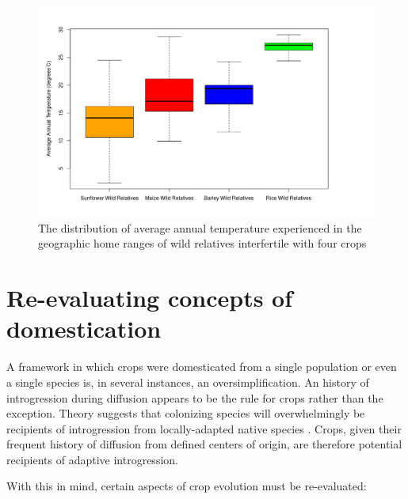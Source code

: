\documentclass[11pt]{article}
\begin{document}
\begin{figure}[h]
	\centering
	\includegraphics[width=17.35cm]{boxplot.png}
	\caption{The distribution of average annual temperature experienced in the geographic home ranges of wild relatives interfertile with four crops}
	\label{fig:map}
\end{figure}

























\section*{Re-evaluating concepts of domestication}

A framework in which crops were domesticated from a single population or even a single species is, in several instances, an oversimplification.
An history of introgression during diffusion appears to be the rule for crops rather than the exception.
Theory suggests that colonizing species will overwhelmingly be recipients of introgression from locally-adapted native species \cite{Currat2008}.
Crops, given their frequent history of diffusion from defined centers of origin, are therefore potential recipients of adaptive introgression.



With this in mind, certain aspects of crop evolution must be re-evaluated:
\end{document}
